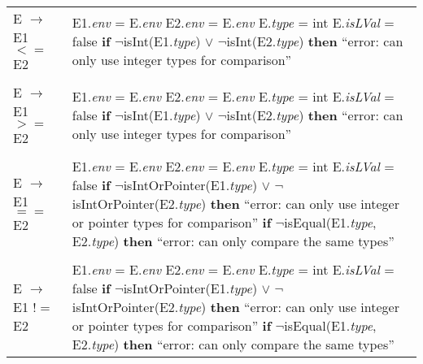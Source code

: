 \documentclass{article}
\begin{document}
\begin{center}
\begin{longtable}{ |l|l| }
    E $\rightarrow$ E1 $<=$ E2 & \makecell[l]{E1.\textit{env} = E.\textit{env} \\ E2.\textit{env} = E.\textit{env} \\ E.\textit{type} = int \\ E.\textit{isLVal} = false \\ \textbf{if} $\neg$isInt(E1.\textit{type}) $\lor$ $\neg$isInt(E2.\textit{type}) \\ \textbf{then} ``error: can only use integer types for comparison''} \\
    
     & \\
    
    E $\rightarrow$ E1 $>=$ E2 & \makecell[l]{E1.\textit{env} = E.\textit{env} \\ E2.\textit{env} = E.\textit{env} \\ E.\textit{type} = int \\ E.\textit{isLVal} = false \\ \textbf{if} $\neg$isInt(E1.\textit{type}) $\lor$ $\neg$isInt(E2.\textit{type}) \\ \textbf{then} ``error: can only use integer types for comparison''} \\
    
     & \\
    
    E $\rightarrow$ E1 $==$ E2 & \makecell[l]{E1.\textit{env} = E.\textit{env} \\ E2.\textit{env} = E.\textit{env} \\ E.\textit{type} = int \\ E.\textit{isLVal} = false \\ \textbf{if} $\neg$isIntOrPointer(E1.\textit{type}) $\lor$ $\neg$isIntOrPointer(E2.\textit{type}) \\ \textbf{then} ``error: can only use integer or pointer types for \\ comparison'' \\ \textbf{if} $\neg$isEqual(E1.\textit{type}, E2.\textit{type}) \\ \textbf{then} ``error: can only compare the same types''} \\
    
     & \\
    
    E $\rightarrow$ E1 $!=$ E2 & \makecell[l]{E1.\textit{env} = E.\textit{env} \\ E2.\textit{env} = E.\textit{env} \\ E.\textit{type} = int \\ E.\textit{isLVal} = false \\ \textbf{if} $\neg$isIntOrPointer(E1.\textit{type}) $\lor$ $\neg$isIntOrPointer(E2.\textit{type}) \\ \textbf{then} ``error: can only use integer or pointer types for \\ comparison'' \\ \textbf{if} $\neg$isEqual(E1.\textit{type}, E2.\textit{type}) \\ \textbf{then} ``error: can only compare the same types''} \\
    

\end{longtable}
\end{center}
\end{document}
